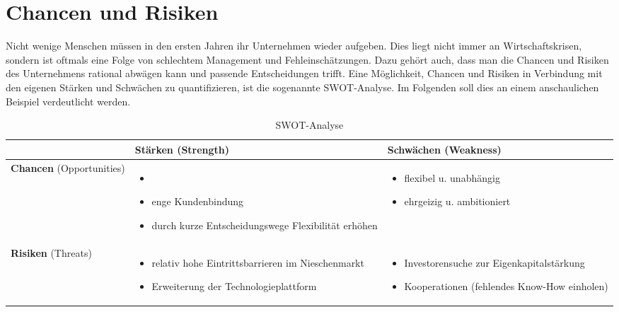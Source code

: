 \chapter{Chancen und Risiken}
Nicht wenige Menschen müssen in den ersten Jahren ihr Unternehmen wieder aufgeben. Dies liegt nicht immer an Wirtschaftskrisen, sondern ist oftmals eine Folge von schlechtem Management und Fehleinschätzungen. Dazu gehört auch, dass man die Chancen und Risiken des Unternehmens rational abwägen kann und passende Entscheidungen trifft. Eine Möglichkeit, Chancen und Risiken in Verbindung mit den eigenen Stärken und Schwächen zu quantifizieren, ist die sogenannte SWOT-Analyse. Im Folgenden soll dies an einem anschaulichen Beispiel verdeutlicht werden.

\begin{center}
	\begin{table}[htbp!]
	\centering
		\begin{tabular}{| M{2cm} | M{6cm} | M{6cm} |}
		\hline
			\textbf{ } & \textbf{Stärken} (Strength) & \textbf{Schwächen} (Weakness) \\ \hline
			\textbf{Chancen} (Opportunities)
			& \begin{itemize}
				\item []
				\item enge Kundenbindung
				\item durch kurze Entscheidungswege Flexibilität erhöhen
			\end{itemize}
			& \begin{itemize}
				\item flexibel u. unabhängig
				\item ehrgeizig u. ambitioniert
			\end{itemize}
			\\ \hline
			
			\textbf{Risiken} (Threats) 
			& \begin{itemize}
				\item relativ hohe Eintrittsbarrieren im Nieschenmarkt
				\item Erweiterung der Technologieplattform
			\end{itemize}
			& \begin{itemize}
				\item Investorensuche zur Eigenkapitalstärkung
				\item Kooperationen (fehlendes Know-How einholen)
			\end{itemize}
			\\ \hline
		\end{tabular}
		\caption{SWOT-Analyse}
		\label{table:swot}
	\end{table}
\end{center}

